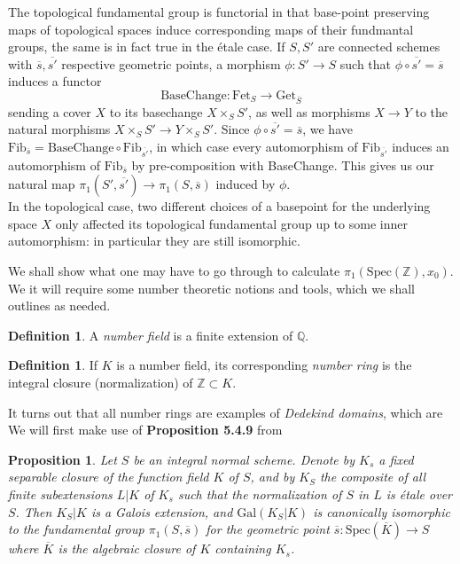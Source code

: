 \documentclass{article}
\theoremstyle{definition}
\newtheorem{definition}[theorem]{Definition}
\theoremstyle{remark}
\theoremstyle{plain}
\newtheorem{proposition}[theorem]{Proposition}
\newcommand{\Z}{\mathbb{Z}}
\newcommand{\Q}{\mathbb{Q}}
\begin{document}
	The topological fundamental group is functorial in that base-point preserving maps of topological spaces induce corresponding maps of their fundmantal groups, the same is in fact true in the \'etale case.
If $S, S'$ are connected schemes with $\overline{s}, \overline{s'}$ respective geometric points, a morphism $\phi: S' \to S$ such that $\phi \circ \overline{s'} = \overline{s}$ induces a functor
\[\text{BaseChange}: \text{Fet}_S \to \text{Get}_{\overline{S}}\]
sending a cover $X$ to its basechange $X \times_S S'$, as well as morphisms $X \to Y$ to the natural morphisms $X \times_S S' \to Y \times_S S'$.
Since $\phi \circ \overline{s'} = \overline{s}$, we have $\text{Fib}_{\overline{s}} = \text{BaseChange} \circ \text{Fib}_{\overline{s'}}$, in which case every automorphism of $\text{Fib}_{\overline{s'}}$ induces an automorphism of $\text{Fib}_{\overline{s}}$ by pre-composition with BaseChange.
This gives us our natural map $\pi_1(S', \overline{s'}) \to \pi_1(S, \overline{s})$ induced by $\phi$.\\


In the topological case, two different choices of a basepoint for the underlying space $X$ only affected its topological fundamental group up to some inner automorphism: in particular they are still isomorphic.


We shall show what one may have to go through to calculate $\pi_1(\text{Spec}(\Z), x_0)$.
We it will require some number theoretic notions and tools, which we shall outlines as needed.

\begin{definition}
	A \textit{number field} is a finite extension of $\Q$.
\end{definition}

\begin{definition}
	If $K$ is a number field, its corresponding \textit{number ring} is the integral closure (normalization)  of $\Z \subset K$.
\end{definition}

It turns out that all number rings are examples of \textit{Dedekind domains}, which are 
We will first make use of \textbf{Proposition 5.4.9} from \cite{Szamuely}

\begin{proposition}
	Let $S$ be an integral normal scheme.
	Denote by $K_s$ a fixed separable closure of the function field $K$ of $S$, and by $K_S$ the composite of all finite subextensions $L|K$ of $K_s$ such that the normalization of $S$ in $L$ is \'etale over $S$.
	Then $K_S|K$ is a Galois extension, and $\text{Gal}(K_S|K)$ is canonically isomorphic to the fundamental group $\pi_1(S, \overline{s})$ for the geometric point $\overline{s}: \text{Spec}(\overline{K} ) \to S$ where $\overline{K}$ is the algebraic closure of $K$ containing $K_s$.

\end{proposition}
\end{document}
